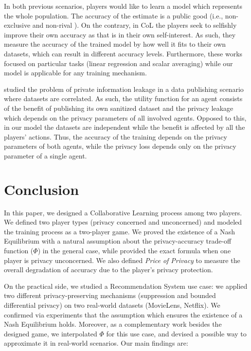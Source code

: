 \documentclass[USenglish,oneside,twocolumn]{article}
\theoremstyle{plain}
\begin{document}
    In both previous scenarios, players would like to learn a model which represents the whole population. The accuracy of the estimate is a public good (i.e., non-exclusive and non-rival \cite{harsanyi1988general}). On the contrary, in CoL the players seek to selfishly improve their own accuracy as that is in their own self-interest. As such, they measure the accuracy of the trained model by how well it fits to their own datasets, which can result in different accuracy levels. Furthermore, these works focused on particular tasks (linear regression and scalar averaging) while our model is applicable for any training mechanism.
    
    \cite{wu2017game} studied the problem of private information leakage in a data publishing scenario where datasets are correlated. As such, the utility function for an agent consists of the benefit of publishing its own sanitized dataset and the privacy leakage which depends on the privacy parameters of all involved agents. Opposed to this, in our model the datasets are independent while the benefit is affected by all the players' actions. Thus, the accuracy of the training depends on the privacy parameters of both agents, while the privacy loss depends only on the privacy parameter of a single agent.

    \vspace{-0.5cm}
    \section{Conclusion}
    \label{sec:conc}
    \vspace{-0.25cm}
    
    In this paper, we designed a Collaborative Learning process among two players. We defined two player types (privacy concerned and unconcerned) and modeled the training process as a two-player game. We proved the existence of a Nash Equilibrium with a natural assumption about the privacy-accuracy trade-off function ($\Phi$) in the general case, while provided the exact formula when one player is privacy unconcerned. We also defined \textit{Price of Privacy} to measure the overall degradation of accuracy due to the player's privacy protection. 
    
    On the practical side, we studied a Recommendation System use case: we applied two different privacy-preserving mechanisms (suppression and bounded differential privacy) on two real-world datasets (MovieLens, Netflix). We confirmed via experiments that the assumption which ensures the existence of a Nash Equilibrium holds. Moreover, as a complementary work besides the designed game, we interpolated $\Phi$ for this use case, and devised a possible way to approximate it in real-world scenarios. Our main findings are:
    
\end{document}
